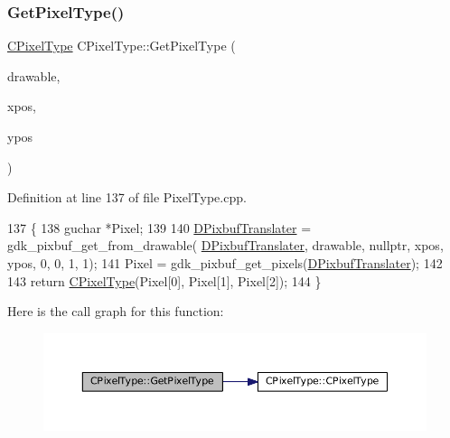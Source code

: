 \subsubsection{\texorpdfstring{Get\+Pixel\+Type()}{GetPixelType()}\hspace{0.1cm}{\footnotesize\ttfamily [2/2]}}
{\footnotesize\ttfamily \hyperlink{classCPixelType}{C\+Pixel\+Type} C\+Pixel\+Type\+::\+Get\+Pixel\+Type (\begin{DoxyParamCaption}\item[{Gdk\+Drawable $\ast$}]{drawable,  }\item[{gint}]{xpos,  }\item[{gint}]{ypos }\end{DoxyParamCaption})\hspace{0.3cm}{\ttfamily [static]}}



Definition at line 137 of file Pixel\+Type.\+cpp.


\begin{DoxyCode}
137                                                                               \{
138     guchar *Pixel;
139     
140     \hyperlink{classCPixelType_af1243e70d11325b487a215ae190db0a2}{DPixbufTranslater} = gdk\_pixbuf\_get\_from\_drawable(
      \hyperlink{classCPixelType_af1243e70d11325b487a215ae190db0a2}{DPixbufTranslater}, drawable, \textcolor{keyword}{nullptr}, xpos, ypos, 0, 0, 1, 1);
141     Pixel = gdk\_pixbuf\_get\_pixels(\hyperlink{classCPixelType_af1243e70d11325b487a215ae190db0a2}{DPixbufTranslater});
142     
143     \textcolor{keywordflow}{return} \hyperlink{classCPixelType_a393381dca7114d6279bcee1e5f280e4b}{CPixelType}(Pixel[0], Pixel[1], Pixel[2]);
144 \}
\end{DoxyCode}
Here is the call graph for this function\+:\nopagebreak
\begin{figure}[H]
\begin{center}
\leavevmode
\includegraphics[width=350pt]{classCPixelType_a91ab76ebf6c87934a8738018686746d4_cgraph}
\end{center}
\end{figure}
\hypertarget{classCPixelType_a3bcba5fcc9d9cb0a2504f6f3d913c175}{}\label{classCPixelType_a3bcba5fcc9d9cb0a2504f6f3d913c175} 

